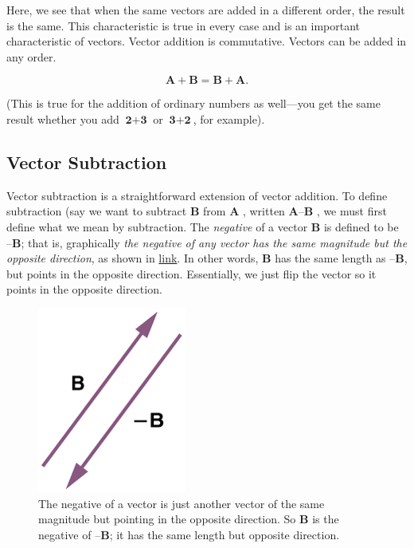 \documentclass[
]{book}
\begin{document}
Here, we see that when the same vectors are added in a different order,
the result is the same. This characteristic is true in every case and is
an important characteristic of vectors. Vector addition is
{commutative}. Vectors can be added in any order.

\leavevmode\hypertarget{eip-376}{}%
\[{\textbf{A} + \textbf{B} = \textbf{B} + \textbf{A}}{}\text{.}\]

(This is true for the addition of ordinary numbers as well---you get the
same result whether you add \({\textbf{2} + \textbf{3}}{}\) or
\({\textbf{3} + \textbf{2}}{}\), for example).

\hypertarget{fs-id1165298779158}{}
\hypertarget{vector-subtraction}{%
\subsection{Vector Subtraction}\label{vector-subtraction}}

Vector subtraction is a straightforward extension of vector addition. To
define subtraction (say we want to subtract \(\textbf{B}\) from
\(\textbf{A}\) , written \(\textbf{A}–\textbf{B}\) , we must first define
what we mean by subtraction. The \emph{negative} of a vector \(\textbf{B}{}\)
is defined to be \(\textbf{–B}\); that is, graphically \emph{the negative of
any vector has the same magnitude but the opposite direction}, as shown
in \protect\hyperlink{import-auto-id1165298692950}{link}. In
other words, \(\textbf{B}{}\) has the same length as \(\textbf{–B}{}\), but
points in the opposite direction. Essentially, we just flip the vector
so it points in the opposite direction.

\begin{figure}
\hypertarget{import-auto-id1165298692950}{%
\centering
\includegraphics{images/Figure_03_02_13a.jpg}
\caption{The negative of a vector is just another vector of the same magnitude
but pointing in the opposite direction. So \(\textbf{B}{}\) is the
negative of \(\textbf{–B}{}\); it has the same length but opposite
direction.}\label{import-auto-id1165298692950}
}
\end{figure}
\end{document}

